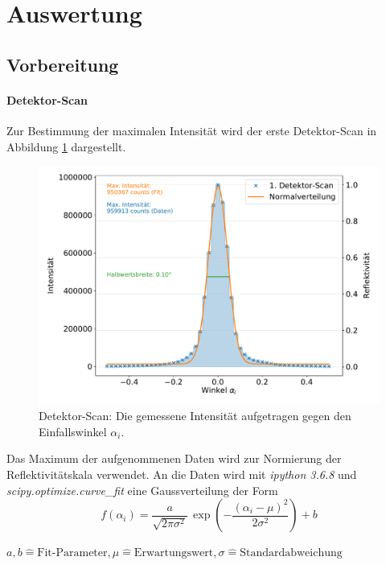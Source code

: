 \section{Auswertung}
\subsection{Vorbereitung}
\label{subsec:vorbereitung}
\paragraph{Detektor-Scan}
Zur Bestimmung der maximalen Intensität wird der erste Detektor-Scan in Abbildung \ref{fig:detek} dargestellt.
\begin{figure}[h!]
  \centering
  \includegraphics[width=\textwidth]{content/images/done_plot_detektorscan.pdf}
  \caption{Detektor-Scan: Die gemessene Intensität aufgetragen gegen den Einfallswinkel $\alpha_i$.}
  \label{fig:detek}
\end{figure}
Das Maximum der aufgenommenen Daten wird zur Normierung der Reflektivitätskala verwendet.
An die Daten wird mit \textit{ipython 3.6.8} und \textit{scipy.optimize.curve\_fit} eine Gaussverteilung der Form
\begin{equation*}
	f(\alpha_i) = \frac{a}{\sqrt{2 \pi \sigma^2}} \, \exp{\left( - \frac{(\alpha_i-\mu)^2}{2 \sigma^2} \right)} + b
\end{equation*}
\begin{center}
	\tiny{$a, b  \widehat{=} \text{Fit-Parameter}, \mu \widehat{=} \text{Erwartungswert}, \sigma \widehat{=} \text{Standardabweichung} $}
\end{center}
